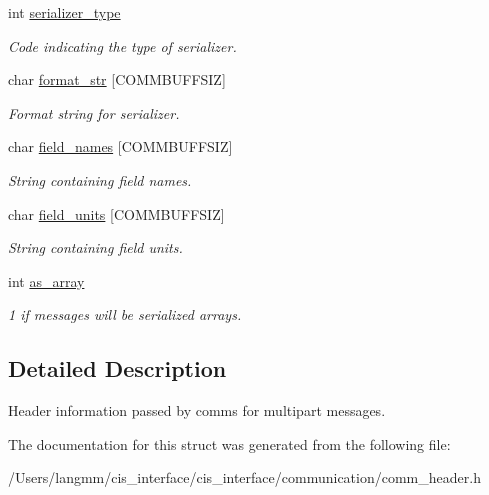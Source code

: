 \begin{DoxyCompactItemize}
\mbox{\label{structcomm__head__t_a4d963ff774cc3537d8944856b2365c6a}} 
int \mbox{\hyperlink{structcomm__head__t_a4d963ff774cc3537d8944856b2365c6a}{serializer\+\_\+type}}
\begin{DoxyCompactList}\small\item\em Code indicating the type of serializer. \end{DoxyCompactList}\item 
\mbox{\label{structcomm__head__t_acfddb7dfc30cd546036af32cab2295e2}} 
char \mbox{\hyperlink{structcomm__head__t_acfddb7dfc30cd546036af32cab2295e2}{format\+\_\+str}} \mbox{[}C\+O\+M\+M\+B\+U\+F\+F\+S\+IZ\mbox{]}
\begin{DoxyCompactList}\small\item\em Format string for serializer. \end{DoxyCompactList}\item 
\mbox{\label{structcomm__head__t_a15efa818f71d8712b6f3270ca3c45ef1}} 
char \mbox{\hyperlink{structcomm__head__t_a15efa818f71d8712b6f3270ca3c45ef1}{field\+\_\+names}} \mbox{[}C\+O\+M\+M\+B\+U\+F\+F\+S\+IZ\mbox{]}
\begin{DoxyCompactList}\small\item\em String containing field names. \end{DoxyCompactList}\item 
\mbox{\label{structcomm__head__t_ac2d45e0c1ac6a748e1516bfac30f359b}} 
char \mbox{\hyperlink{structcomm__head__t_ac2d45e0c1ac6a748e1516bfac30f359b}{field\+\_\+units}} \mbox{[}C\+O\+M\+M\+B\+U\+F\+F\+S\+IZ\mbox{]}
\begin{DoxyCompactList}\small\item\em String containing field units. \end{DoxyCompactList}\item 
\mbox{\label{structcomm__head__t_a68f4fd55f648414958edcd564be498b7}} 
int \mbox{\hyperlink{structcomm__head__t_a68f4fd55f648414958edcd564be498b7}{as\+\_\+array}}
\begin{DoxyCompactList}\small\item\em 1 if messages will be serialized arrays. \end{DoxyCompactList}\end{DoxyCompactItemize}


\subsection{Detailed Description}
Header information passed by comms for multipart messages. 

The documentation for this struct was generated from the following file\+:\begin{DoxyCompactItemize}
\item 
/\+Users/langmm/cis\+\_\+interface/cis\+\_\+interface/communication/comm\+\_\+header.\+h\end{DoxyCompactItemize}
